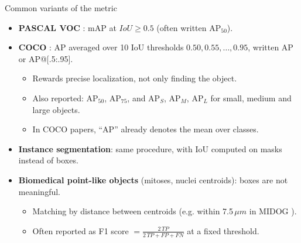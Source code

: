 \documentclass[xcolor=pdftex,dvipsnames,table]{beamer}
\begin{document}
\begin{frame}{Common variants of the metric}
\begin{itemize}
  \item \textbf{PASCAL VOC} \cite{Everingham2010}: mAP at $IoU \geq 0.5$ (often written AP$_{50}$).
  \item \textbf{COCO} \cite{Lin2014}: AP averaged over 10 IoU thresholds $0.50, 0.55, \ldots, 0.95$, written AP or AP@[.5:.95].
  \begin{itemize}
    \item Rewards precise localization, not only finding the object.
    \item Also reported: AP$_{50}$, AP$_{75}$, and AP$_S$, AP$_M$, AP$_L$ for small, medium and large objects.
    \item In COCO papers, ``AP'' already denotes the mean over classes.
  \end{itemize}
  \item \textbf{Instance segmentation}: same procedure, with IoU computed on masks instead of boxes.
  \item \textbf{Biomedical point-like objects} (mitoses, nuclei centroids): boxes are not meaningful.
  \begin{itemize}
    \item Matching by distance between centroids (e.g. within 7.5\,$\mu m$ in MIDOG \cite{Aubreville2023}).
    \item Often reported as F1 score $= \frac{2\,TP}{2\,TP + FP + FN}$ at a fixed threshold.
  \end{itemize}
\end{itemize}
\end{frame}
\end{document}
